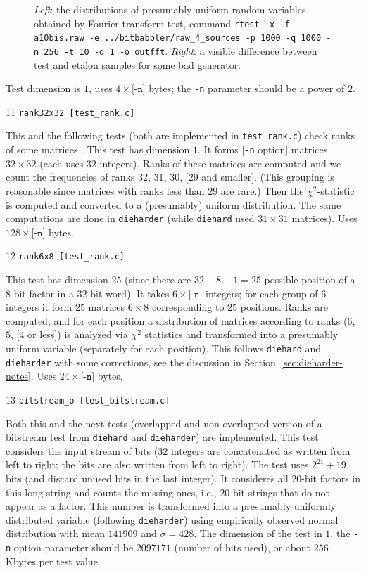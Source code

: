 \documentclass[12pt,a4paper,fullpage]{article}
\begin{document}
\begin{description}
\begin{figure}[t]
\begin{center}
\end{center}
\caption{\emph{Left}: the distributions of presumably uniform random variables obtained by Fourier transform test, command \texttt{rtest -x -f a10bis.raw -e ../bitbabbler/raw\_4\_sources -p 1000 -q 1000 -n 256 -t 10 -d 1  -o outfft}. \emph{Right}: a visible difference between test and etalon samples for some bad generator.}
\label{pic:fft-approx}
\end{figure}

Test dimension is $1$, uses $4\times \texttt{[-n]}$ bytes; the \texttt{-n} parameter should be a power of $2$.


\item{11} \texttt{rank32x32 [test\_rank.c]}

This and the following tests (both are implemented in \texttt{test\_rank.c}) check ranks of some matrices . This test has dimension $1$. It forms [\texttt{-n} option] matrices  $32\times 32$ (each uses $32$ integers). Ranks of these matrices are computed and we count the frequencies of ranks $32$, $31$, $30$, [$29$ and smaller]. (This grouping is reasonable since matrices with ranks less than $29$ are rare.) Then the $\chi^2$-statistic is computed and converted to a (presumably) uniform distribution. The same computations are done in  \texttt{dieharder} (while \texttt{diehard} used $31\times 31$ matrices). Uses $128\times\texttt{[-n]}$ bytes.

\item{12} \texttt{rank6x8 [test\_rank.c]}

This test has dimension $25$ (since there are $32-8+1=25$ possible position of a $8$-bit factor in a $32$-bit word). It takes $6\times\texttt{[-n]}$ integers; for each group of $6$ integers it form $25$ matrices $6\times 8$ corresponding to $25$ positions. Ranks are computed, and for each position a distribution of matrices according to ranks ($6$, $5$, [$4$ or less]) is analyzed via $\chi^2$ statistics and transformed into a presumably uniform variable (separately for each position). This follows \texttt{diehard} and \texttt{dieharder} with some corrections, see the discussion in Section~\ref{sec:dieharder-notes}. Uses $24\times\texttt{[-n]}$ bytes.

\item{13} \texttt{bitstream\_o [test\_bitstream.c]}

Both this and the next tests (overlapped and non-overlapped version of a bitstream test from \texttt{diehard} and \texttt{dieharder}) are implemented. This test considers the input stream of bits ($32$ integers are concatenated as written from left to right; the bits are also written from left to right). The test uses $2^{21}+19$ bits (and discard unused bits in the last integer). It consideres all $20$-bit factors in this long string and counts the missing ones, i.e., $20$-bit strings that do not appear as a factor. This number is transformed into a presumably uniformly distributed variable (following \texttt{dieharder}) using empirically observed normal distribution with mean  $141909$ and $\sigma=428$. The dimension of the test in $1$, the \texttt{-n} option parameter should be $2097171$ (number of bits used), or about $256$ Kbytes per test value.


\end{description}
\end{document}
